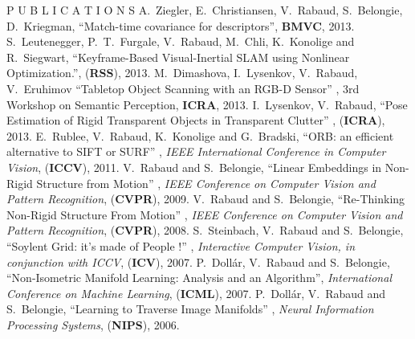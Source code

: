 




\begin{rubric}{P U B L I C A T I O N S}
\entry*[2013]
A.~Ziegler, E.~Christiansen, V.~Rabaud, S.~Belongie, D.~Kriegman, ``Match-time covariance for 
descriptors'', \textbf{BMVC}, 2013.
\entry*[2013]
S.~Leutenegger, P.~T.~Furgale, V.~Rabaud, M.~Chli, K.~Konolige and R.~Siegwart, ``Keyframe-Based Visual-Inertial SLAM using Nonlinear Optimization.'', (\textbf{RSS}), 2013.
\entry*[2013]
M.~Dimashova, I.~Lysenkov, V.~Rabaud, V.~Eruhimov ``Tabletop Object Scanning with an RGB-D Sensor'' , 3rd Workshop 
on Semantic Perception, \textbf{ICRA}, 2013.
\entry*[2013]
I.~Lysenkov, V.~Rabaud, ``Pose Estimation of Rigid Transparent Objects in Transparent Clutter'' , 
(\textbf{ICRA}), 2013.
\entry*[2011]
E.~Rublee, V.~Rabaud, K.~Konolige and G.~Bradski, ``ORB: an efficient alternative to SIFT or SURF'' , {\em IEEE 
International Conference in Computer Vision}, (\textbf{ICCV}), 2011.
\entry*[2009]
V.~Rabaud and S.~Belongie, ``Linear Embeddings in Non-Rigid Structure from
Motion'' , {\em IEEE Conference on Computer Vision and Pattern Recognition},
(\textbf{CVPR}), 2009.
\entry*[2008]
V.~Rabaud and S.~Belongie, ``Re-Thinking Non-Rigid Structure From Motion'' ,
{\em IEEE Conference on Computer Vision and Pattern Recognition},
(\textbf{CVPR}), 2008.
\entry*[2007]
S.~Steinbach, V.~Rabaud and S.~Belongie, ``Soylent Grid: it's made of People !'' , {\em Interactive Computer Vision, in conjunction with ICCV}, (\textbf{ICV}), 2007.
\entry*[2007]
P.~Doll\'ar, V.~Rabaud and S.~Belongie, ``Non-Isometric Manifold Learning: Analysis and an Algorithm'', {\em International Conference on Machine Learning}, (\textbf{ICML}), 2007.
\entry*[2006]
P.~Doll\'ar, V.~Rabaud and S.~Belongie, ``Learning to Traverse Image Manifolds'' , {\em Neural Information Processing Systems}, (\textbf{NIPS}), 2006. 

\end{rubric}
